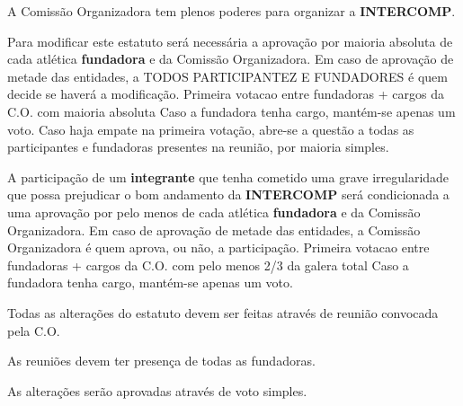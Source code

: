 \begin{article}
	A Comissão Organizadora tem plenos poderes para organizar a \textbf{INTERCOMP}.

	\begin{xparagraph}
		Para modificar este estatuto será necessária a aprovação por maioria absoluta de cada atlética \textbf{fundadora} e da Comissão Organizadora. Em caso de aprovação de metade das entidades, a TODOS PARTICIPANTEZ E FUNDADORES é quem decide se haverá a modificação.
		Primeira votacao entre fundadoras + cargos da C.O. com maioria absoluta
		Caso a fundadora tenha cargo, mantém-se apenas um voto.
		Caso haja empate na primeira votação, abre-se a questão a todas as participantes e fundadoras presentes na reunião, por maioria simples.
	\end{xparagraph}

	\begin{xparagraph}
		A participação de um \textbf{integrante} que tenha cometido uma grave irregularidade que possa prejudicar o bom andamento da \textbf{INTERCOMP} será condicionada a uma aprovação por pelo menos  de cada atlética \textbf{fundadora} e da Comissão Organizadora. Em caso de aprovação de metade das entidades, a Comissão Organizadora é quem aprova, ou não, a participação.
		Primeira votacao entre fundadoras + cargos da C.O. com pelo menos 2/3 da galera total
		Caso a fundadora tenha cargo, mantém-se apenas um voto.
	\end{xparagraph}
\end{article}

\begin{article}
	Todas as alterações do estatuto devem ser feitas através de reunião convocada pela C.O.

	\begin{xparagraph}
		As reuniões devem ter presença de todas as fundadoras.
	\end{xparagraph}

	\begin{xparagraph}
		As alterações serão aprovadas através de voto simples.
	\end{xparagraph}
\end{article}

